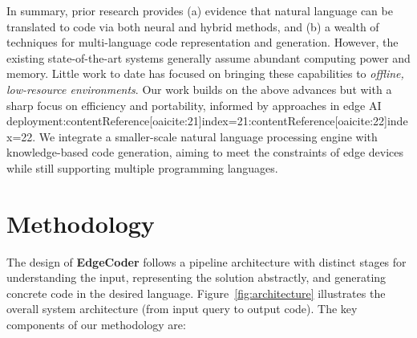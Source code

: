 \documentclass[12pt]{article}
\begin{document}
In summary, prior research provides (a) evidence that natural language can be translated to code via both neural and hybrid methods, and (b) a wealth of techniques for multi-language code representation and generation. However, the existing state-of-the-art systems generally assume abundant computing power and memory. Little work to date has focused on bringing these capabilities to \textit{offline, low-resource environments}. Our work builds on the above advances but with a sharp focus on efficiency and portability, informed by approaches in edge AI deployment:contentReference[oaicite:21]{index=21}:contentReference[oaicite:22]{index=22}. We integrate a smaller-scale natural language processing engine with knowledge-based code generation, aiming to meet the constraints of edge devices while still supporting multiple programming languages.

\section{Methodology}
\noindent 
The design of \textbf{EdgeCoder} follows a pipeline architecture with distinct stages for understanding the input, representing the solution abstractly, and generating concrete code in the desired language. Figure~\ref{fig:architecture} illustrates the overall system architecture (from input query to output code). The key components of our methodology are:
\end{document}
